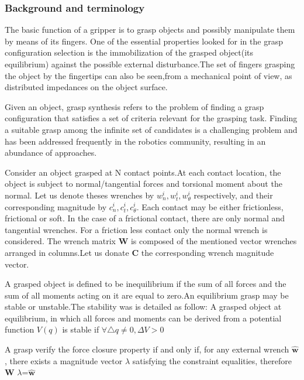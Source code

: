 \subsubsection{Background and terminology}
The basic function of a gripper is to grasp objects and possibly
manipulate them by means of its fingers. One of the essential
properties looked for in the grasp configuration selection is the
immobilization of the grasped object(its equilibrium) against the
possible external disturbance.The set of fingers grasping the object
by the fingertips can also be seen,from a mechanical point of view,
as distributed impedances on the object surface.
\par
Given an object, grasp synthesis refers to the problem of
finding a grasp configuration that satisfies a set of criteria
relevant for the grasping task. Finding a suitable grasp among
the infinite set of candidates is a challenging problem and has
been addressed frequently in the robotics community, resulting
in an abundance of approaches.
\par
Consider an object grasped at N contact points.At each contact
location, the object is subject to normal/tangential forces and
torsional moment about the normal. Let us denote theses wrenches by
$w_{n}^{i},w_{t}^{i},w_{\theta}^{i}$ respectively, and their corresponding magnitude
by $c_{n}^{i},c_{t}^{i},c_{\theta}^{i}$. Each contact may be either frictionless, frictional
or soft. In the case of a frictional contact, there are only normal
and tangential wrenches. For a friction less contact only the normal
wrench is considered. The wrench matrix \textbf{W}  is composed of the
mentioned vector wrenches arranged in columns.Let us donate 
\textbf{C} the corresponding wrench magnitude vector.
\par
A grasped object is defined to be inequilibrium if the sum of all forces and the sum of all moments acting on it are equal to zero.An equilibrium grasp may be stable or unstable.The stability was is detailed as follow: A grasped object at
equilibrium, in which all forces and moments can be derived from a potential function $ V(q) $ is stable if $ \forall\bigtriangleup q\neq0, \Delta V>0 $
\par
A grasp verify the force closure property if and only if, for any external wrench
\textbf{$\widehat{\textbf{w}}$}, there exists a magnitude vector $\lambda$ satisfying the constraint equalities, therefore \textbf{W} $\lambda$=\textbf{$\widehat{\textbf{w}}$}

